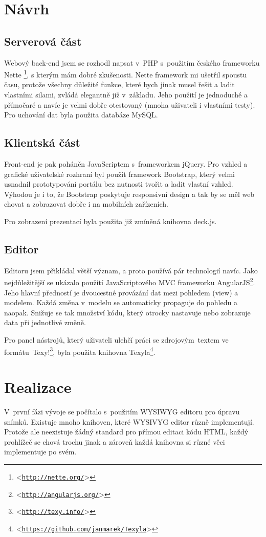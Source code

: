 \documentclass[11pt,twoside,a4paper]{book}
\let\oldUrl\url									%
\renewcommand\url[1]{<\texttt{\oldUrl{#1}}>}
\begin{document}
\chapter{Návrh}

\section{Serverová část}
Webový back-end jsem se rozhodl napsat v~PHP s~použitím českého frameworku Nette \footnote{\url{http://nette.org/}}, s kterým mám dobré zkušenosti. Nette framework mi ušetřil spoustu času, protože všechny důležité funkce, které bych jinak musel řešit a ladit vlastními silami, zvládá elegantně již v~základu. Jeho použití je jednoduché a přímočaré a navíc je velmi dobře otestovaný (mnoha uživateli i vlastními testy). Pro uchování dat byla použita databáze MySQL.


\section{Klientská část}
Front-end je pak poháněn JavaScriptem s~frameworkem jQuery. Pro vzhled a grafické uživatelské rozhraní byl použit framework Bootstrap, který velmi usnadnil prototypování portálu bez nutnosti tvořit a ladit vlastní vzhled. Výhodou je i to, že Bootstrap poskytuje responsivní design a tak by se měl web chovat a zobrazovat dobře i na mobilních zařízeních.

Pro zobrazení prezentací byla použita již zmíněná knihovna deck.js.


\section{Editor}
Editoru jsem přikládal větší význam, a proto používá pár technologií navíc. Jako nejdůležitější se ukázalo použití JavaScriptového MVC frameworku AngularJS\footnote{\url{http://angularjs.org/}}. Jeho hlavní předností je dvoucestné provázání dat mezi pohledem (view) a modelem. Každá změna v~modelu se automaticky propaguje do pohledu a naopak. Snižuje se tak množství kódu, který otrocky nastavuje nebo zobrazuje data při jednotlivé změně.

Pro panel nástrojů, který uživateli ulehčí práci se zdrojovým~textem ve formátu~Texy!\footnote{\url{http://texy.info/}}, byla použita knihovna Texyla\footnote{\url{https://github.com/janmarek/Texyla}}.



\chapter{Realizace} \label{chap:realizace}
V~první fázi vývoje se počítalo s~použitím WYSIWYG editoru pro úpravu snímků. Existuje mnoho knihoven, které WYSIVYG
editor různě implementují. Protože ale neexistuje žádný standard pro přímou editaci kódu HTML, každý prohlížeč se chová
trochu jinak a zároveň každá knihovna si různé věci implementuje po svém.
\end{document}
